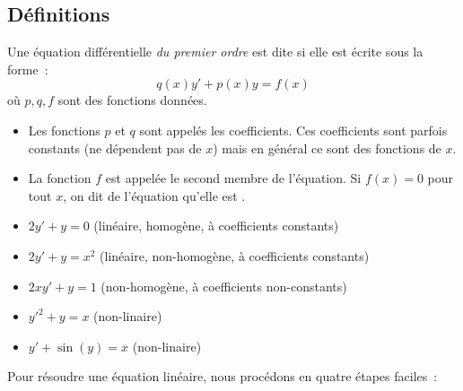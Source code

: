 \subsection{Définitions}
\begin{frame}
  \begin{definition}\pause
    Une équation différentielle \emph{du premier ordre} est dite \pause{} si elle est écrite sous la forme~:\pause{}
    \begin{equation*}
      q(x) y' +  p(x) y = f(x) \tag{EL}
    \end{equation*}
    où \(p,q,f\) sont des fonctions données.
  \end{definition}
  \pause{}

  \begin{itemize}
  \item Les fonctions \(p\) et \(q\) sont appelés les \og coefficients\fg{}.\pause{} Ces coefficients sont parfois constants (ne dépendent pas de \(x\)) mais en général ce sont des fonctions de \(x\).\pause{}
  \item La fonction \(f\) est appelée le \og second membre\fg{} de l'équation.\pause{} Si \(f(x) = 0\) pour tout \(x\),\pause{} on dit de l'équation qu'elle est .
  \end{itemize}\pause{}
\end{frame}
\begin{frame}
  \begin{example}\pause{}
    \begin{itemize}
    \item \(2 y' + y = 0\)\pause{} (linéaire,\pause{} homogène,\pause{} à coefficients constants)\pause{}
    \item \(2 y' + y = x^{2}\)\pause{} (linéaire,\pause{} non-homogène,\pause{} à coefficients constants)\pause{}
    \item \(2 x y' + y = 1\)\pause{} (non-homogène,\pause{} à coefficients non-constants)\pause{}
    \item \(y'^{2} + y = x\)\pause{} (non-linaire)\pause{}
    \item \(y' + \sin(y) = x\)\pause{} (non-linaire)
    \end{itemize}
  \end{example}\pause{}
  Pour résoudre une équation linéaire,\pause{} nous procédons en quatre étapes faciles~:
\end{frame}



